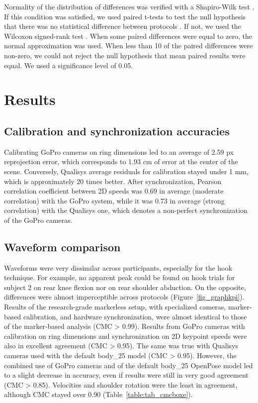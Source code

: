 Normality of the distribution of differences was verified with a Shapiro-Wilk test \cite{Shapiro1965}. If this condition was satisfied, we used paired t-tests to test the null hypothesis that there was no statistical difference between protocols \cite{Student1908}. If not, we used the Wilcoxon signed-rank test \cite{Wilcoxon1945}. When some paired differences were equal to zero, the normal approximation was used. When less than 10 of the paired differences were non-zero, we could not reject the null hypothesis that mean paired results were equal. We used a significance level of 0.05.


\section{Results}

\subsection{Calibration and synchronization accuracies}

Calibrating GoPro cameras on ring dimensions led to an average of 2.59 px reprojection error, which corresponds to 1.93 cm of error at the center of the scene. Conversely, Qualisys average residuals for calibration stayed under 1 mm, which is approximately 20 times better. After synchronization, Pearson correlation coefficient between 2D speeds was 0.69 in average (moderate correlation) with the GoPro system, while it was 0.73 in average (strong correlation) with the Qualisys one, which denotes a non-perfect synchronization of the GoPro cameras. 


\subsection{Waveform comparison}

Waveforms were very dissimilar across participants, especially for the hook technique. For example, no apparent peak could be found on hook trials for subject 2 on rear knee flexion nor on rear shoulder abduction. On the opposite, differences were almost imperceptible across protocols (Figure~\ref{fig_graphkpi}). Results of the research-grade markerless setup, with specialized cameras, marker-based calibration, and hardware synchronization, were almost identical to those of the marker-based analysis (CMC > 0.99). Results from GoPro cameras with calibration on ring dimensions and synchronization on 2D keypoint speeds were also in excellent agreement (CMC > 0.95). The same was true with Qualisys cameras used with the default body\_25 model (CMC > 0.95). However, the combined use of GoPro cameras and of the default body\_25 OpenPose model led to a slight decrease in accuracy, even if results were still in very good agreement (CMC > 0.85). Velocities and shoulder rotation were the least in agreement, although CMC stayed over 0.90 (Table~\ref{table:tab_cmcboxe}).

